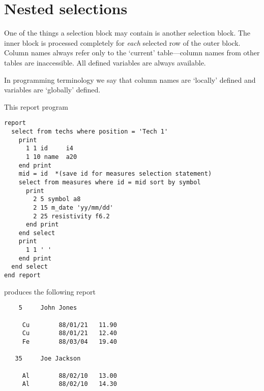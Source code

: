 \documentclass[11pt,a4paper]{report}
\def\I{\index}
\begin{document}
 
\section{Nested selections}
%
\I{select statement}
One of the things a selection block may contain is another
selection block.
The inner block is processed completely for {\em each} selected
row of the outer block.
Column names always refer only to the `current' table---column
names from other tables are inaccessible.  All defined
variables are always available.
 
 
In programming terminology we say that column names are `locally'
defined and variables are `globally' defined.
 
\demobreak
This report program
\begin{verbatim}
report
  select from techs where position = 'Tech 1'
    print
      1 1 id     i4
      1 10 name  a20
    end print
    mid = id  *(save id for measures selection statement)
    select from measures where id = mid sort by symbol
      print
        2 5 symbol a8
        2 15 m_date 'yy/mm/dd'
        2 25 resistivity f6.2
      end print
    end select
    print
      1 1 ' '
    end print
  end select
end report
\end{verbatim}
\demobreak
produces the following report
 

\begin{verbatim}
    5     John Jones
 
     Cu        88/01/21   11.90
     Cu        88/01/21   12.40
     Fe        88/03/04   19.40
 
   35     Joe Jackson
 
     Al        88/02/10   13.00
     Al        88/02/10   14.30
 
\end{verbatim}
 
\end{document}
